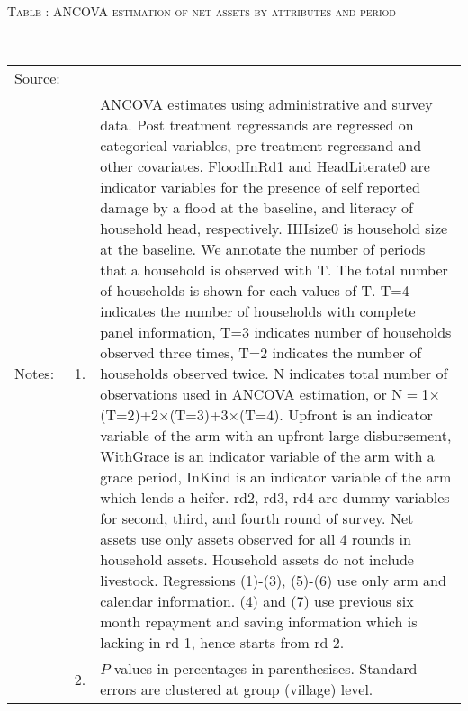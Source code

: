 \hspace{-1cm}\begin{minipage}[t]{14cm}
\hfil\textsc{\normalsize Table \thetable: ANCOVA estimation of net assets by attributes and period\label{tab ANCOVA narrow net assets timevarying attributes}}\\
\setlength{\tabcolsep}{1pt}
\setlength{\baselineskip}{8pt}
\renewcommand{\arraystretch}{.55}
\hfil{}\\
\renewcommand{\arraystretch}{.8}
\setlength{\tabcolsep}{1pt}
\begin{tabular}{>{\hfill\scriptsize}p{1cm}<{}>{\hfill\scriptsize}p{.25cm}<{}>{\scriptsize}p{12cm}<{\hfill}}
Source:& \multicolumn{2}{l}{\scriptsize Estimated with GUK administrative and survey data.}\\
Notes: & 1. & ANCOVA estimates using administrative and survey data. Post treatment regressands are regressed on categorical variables, pre-treatment regressand and other covariates. \textsf{FloodInRd1} and \textsf{HeadLiterate0} are indicator variables for the presence of self reported damage by a flood at the baseline, and literacy of household head, respectively. \textsf{HHsize0} is household size at the baseline. We annotate the number of periods that a household is observed with \textsf{T}. The total number of households is shown for each values of \textsf{T}. \textsf{T=4} indicates the number of households with complete panel information, \textsf{T=3} indicates number of households observed three times, \textsf{T=2} indicates the number of households observed twice. \textsf{N} indicates total number of observations used in ANCOVA estimation, or \textsf{N$=$1$\times$(T=2)+2$\times$(T=3)+3$\times$(T=4)}.  \textsf{Upfront} is an indicator variable of the arm with an upfront large disbursement, \textsf{WithGrace} is an indicator variable of the arm with a grace period, \textsf{InKind} is an indicator variable of the arm which lends a heifer. \textsf{rd2, rd3, rd4} are dummy variables for second, third, and fourth round of survey. Net assets use only assets observed for all 4 rounds in household assets. Household assets do not include livestock. Regressions (1)-(3), (5)-(6) use only arm and calendar information. (4) and (7) use previous six month repayment and saving information which is lacking in rd 1, hence starts from rd 2.\\
& 2. & $P$ values in percentages in parenthesises. Standard errors are clustered at group (village) level.
\end{tabular}
\end{minipage}


